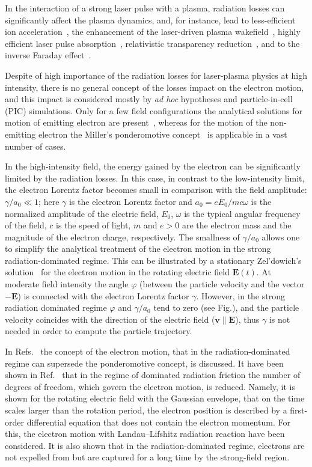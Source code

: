 In the interaction of a strong laser pulse with a plasma, radiation losses can significantly
affect the plasma dynamics, and, for instance, lead to less-efficient ion
acceleration~\cite{Tamburini10, Tamburini12, Capdessus12, Capdessus15, Nerush15}, the enhancement of
the laser-driven plasma wakefield~\cite{Gelfer18a, Gelfer18b}, highly efficient
laser pulse absorption~\cite{Grismayer16}, relativistic transparency reduction~\cite{Zhang15}, and
to the inverse Faraday effect~\cite{Liseykina16}.

Despite of high importance of the radiation losses
for laser-plasma physics at high intensity, there is no general concept of the losses impact
on the electron motion, and this impact is considered mostly by \textit{ad hoc}
hypotheses and particle-in-cell (PIC) simulations.  Only for a few field configurations the
analytical solutions for motion of emitting electron are present~\cite{Zeldovich75, Di08a,
Kostyukov16a}, whereas for the motion of the non-emitting electron the Miller's ponderomotive
concept~\cite{Miller58} is applicable in a vast number of cases.

In the high-intensity field, the energy gained by the electron can be
significantly limited by the radiation losses. In this case, in contrast to the low-intensity
limit, the electron Lorentz factor becomes small in comparison with the field amplitude: $\gamma /
a_0 \ll 1$; here
$\gamma$ is the electron Lorentz factor and $a_0 = e E_0 / mc \omega$ is the normalized amplitude
of the electric field, $E_0$, $\omega$ is the typical angular frequency of the field, $c$ is the speed of
light, $m$ and $e>0$ are the electron mass and the magnitude of the electron charge, respectively.
The smallness of $\gamma / a_0$ allows one to simplify the analytical treatment of the electron motion
in the strong radiation-dominated regime. This can be illustrated by a stationary Zel'dowich's
solution~\cite{Zeldovich75} for the electron motion in the rotating electric field $\mathbf E(t)$. At
moderate field intensity the angle $\varphi$ (between the particle velocity and the vector
$-\mathbf E$) is
connected with the electron Lorentz factor $\gamma$. However, in the strong radiation dominated
regime $\varphi$ and $\gamma / a_0$ tend to zero (see Fig.), and the particle velocity
coincides with the direction
of the electric field ($\mathbf{v \parallel E}$), thus $\gamma$ is not needed in order to compute the particle trajectory.

In Refs.~\cite{Fedotov14b, Gonoskov17} the concept of the electron motion, that in the
radiation-dominated regime can supersede the ponderomotive concept, is discussed. It have been shown
in Ref.~\cite{Fedotov14b} that in the regime of dominated radiation friction the number of degrees
of freedom, which govern the electron motion, is reduced. Namely, it is shown for the rotating
electric field with the Gaussian envelope, that on the time scales larger than the rotation period,
the electron position is described by a first-order differential equation that does not contain the
electron momentum. For this, the electron motion with Landau--Lifshitz radiation reaction have been
considered. It is also shown that in the radiation-dominated regime,
electrons are not expelled from but are captured for a long time by the strong-field region.

